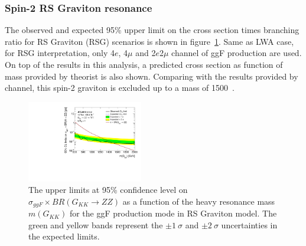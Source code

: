 \subsubsection{Spin-2 RS Graviton resonance}

The observed and expected 95\% upper limit on the cross section times branching ratio for RS Graviton (RSG) scenarios is shown in figure~\ref{fig:RSGlimits_ggF_201518}.
Same as LWA case, for RSG interpretation, only 4$e$, 4$\mu$ and 2$e$2$\mu$ channel of ggF production are used.
On top of the results in this analysis, a predicted cross section as function of mass provided by theorist is also shown.
Comparing with the results provided by \llll channel, this spin-2 graviton is excluded up to a mass of 1500~\gev.

\begin{figure}[h]
    \begin{center}
    \includegraphics[width=0.45\textwidth]{figures/HMHZZ/results/RSG_4l.pdf}
    \end{center}
    \caption{The upper limits at 95\% confidence level on $\sigma_{ggF} \times BR(G_{KK}\rightarrow ZZ)$
    as a function of the heavy resonance mass $m(G_{KK})$ for the ggF production mode in RS Graviton model.
    The green and yellow bands represent the $\pm 1~\sigma$ and $\pm 2~\sigma$ uncertainties in the expected limits.
  }
    \label{fig:RSGlimits_ggF_201518}
\end{figure}

